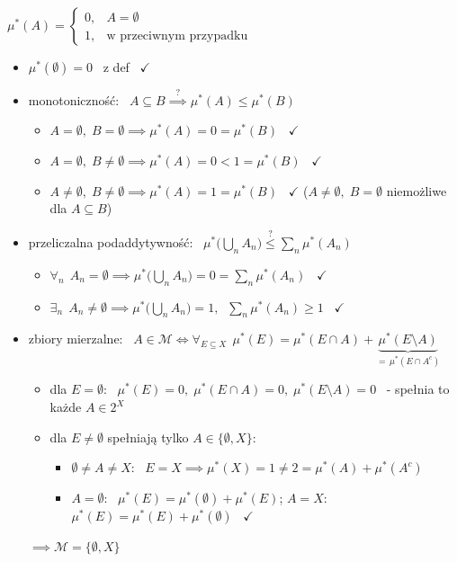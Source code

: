 \documentclass[a4paper,12pt]{article}
\begin{document}
\begin{podpunkty}
    \item \(\mu^*(A) = \begin{cases} 0, & A = \emptyset \\ 1, & \text{w przeciwnym przypadku} \end{cases}\)
    \begin{itemize}
        \item \(\mu^*(\emptyset) = 0\) \, z def \, \(\checkmark\)
        \item monotoniczność: \, \(A \subseteq B \overset{?}{\implies} \mu^*(A) \leq \mu^*(B)\)
        \begin{itemize}
            \item[\(1^\circ\)] \(A = \emptyset, \; B = \emptyset \implies \mu^*(A) = 0 = \mu^*(B)\) \, \(\checkmark\)
            \item[\(2^\circ\)] \(A = \emptyset, \; B \neq \emptyset \implies \mu^*(A) = 0 < 1 = \mu^*(B)\) \, \(\checkmark\)
            \item[\(3^\circ\)] \(A \neq \emptyset, \; B \neq \emptyset \implies \mu^*(A) = 1 = \mu^*(B)\) \, \(\checkmark\) \quad (\(A \neq \emptyset, \; B = \emptyset\) niemożliwe dla \(A \subseteq B\))
        \end{itemize}
        \item przeliczalna podaddytywność: \, \(\mu^*\big(\bigcup_n A_n\big) \overset{?}{\leq} \sum_n \mu^*(A_n)\)
        \begin{itemize}
            \item[\(1^\circ\)] \(\forall_n \;\, A_n = \emptyset \implies \mu^*\big(\bigcup_n A_n\big) = 0 = \sum_n \mu^*(A_n)\) \, \(\checkmark\)
            \item[\(2^\circ\)] \(\exists_n \;\, A_n \neq \emptyset \implies \mu^*\big(\bigcup_n A_n\big) = 1, \;\; \sum_n \mu^*(A_n) \geq 1\) \, \(\checkmark\)
        \end{itemize}
        \item zbiory mierzalne: \, \(A \in \mathcal{M} \iff \forall_{E \subseteq X} \;\, \mu^*(E) = \mu^*(E \cap A) + \underbrace{\mu^*(E \setminus A)}_{= \, \mu^*(E \cap A^c)}\)
        \begin{itemize}
            \item dla \(E = \emptyset\): \, \(\mu^*(E) = 0, \; \mu^*(E \cap A) = 0, \; \mu^*(E \setminus A) = 0\) \, - spełnia to każde \(A \in 2^X\)
            \item dla \(E \neq \emptyset\) spełniają tylko \(A \in \{\emptyset, X\}\):
            \begin{itemize}
                \item \(\emptyset \neq A \neq X\): \, \(E = X \implies \mu^*(X) = 1 \neq 2 = \mu^*(A) + \mu^*(A^c)\)
                \item \(A = \emptyset\): \, \(\mu^*(E) = \mu^*(\emptyset) + \mu^*(E)\); \; \(A = X\): \, \(\mu^*(E) = \mu^*(E) + \mu^*(\emptyset)\) \, \(\checkmark\)
            \end{itemize}
        \end{itemize}
        \(\implies \mathcal{M} = \{\emptyset, X\}\)
    \end{itemize}


\end{podpunkty}
\end{document}
